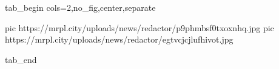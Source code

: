  
 
 
 
 


\ifcmt
  tab_begin cols=2,no_fig,center,separate

     pic https://mrpl.city/uploads/news/redactor/p9phmbsf0txoxnhq.jpg
     pic https://mrpl.city/uploads/news/redactor/egtvcjcjlufhivot.jpg

  tab_end
\fi
